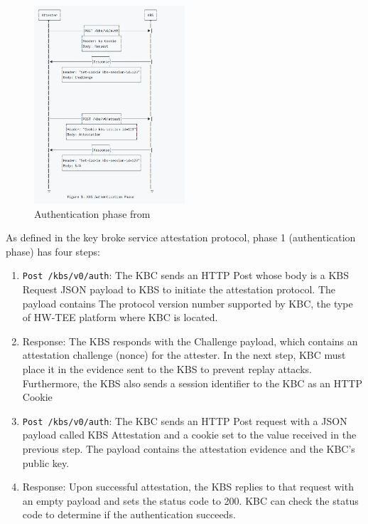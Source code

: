 \begin{figure}[htp]
    \centering
    \includegraphics[width=0.5\textwidth]{images/attestation.PNG}
    \caption[Authentication phase]{Authentication phase from~\cite*{kbs_Attestation_protocol}}
    \label{fig:Authentication}
\end{figure}

As defined in the key broke service attestation protocol, phase 1 (authentication phase) has four steps: 
\begin{displayquote}
    \begin{enumerate}
        \item  \texttt{Post /kbs/v0/auth}: The KBC sends an HTTP Post whose body is a KBS Request JSON payload to KBS to initiate the attestation protocol. The payload contains The protocol version number supported by KBC, the type of HW-TEE platform where KBC is located.
        \item  Response: The KBS responds with the Challenge payload, which contains an attestation challenge (nonce) for the attester. In the next step, KBC must place it in the evidence sent to the KBS to prevent replay attacks. Furthermore, the KBS also sends a session identifier to the KBC as an HTTP Cookie
        \item  \texttt{Post /kbs/v0/auth}: The KBC sends an HTTP Post request with a JSON payload called KBS Attestation and a cookie set to the value received in the previous step. The payload contains the attestation evidence and the KBC’s public key.
        \item  Response: Upon successful attestation, the KBS replies to that request with an empty payload and sets the status code to 200. KBC can check the status code to determine if the authentication succeeds. 
    \end{enumerate}
\end{displayquote}

